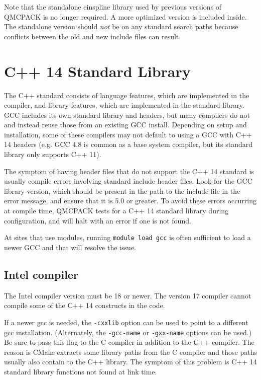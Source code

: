 Note that the standalone einspline library used by previous versions of QMCPACK
is no longer required. A more optimized version is included
inside. The standalone version should \emph{not} be on any standard
search paths because conflicts between the old and new include files
can result.

\section{C++ 14 Standard Library}
The C++ standard consists of language features, which are implemented in the compiler, and library features, which are implemented in the standard library.
GCC includes its own standard library and headers, but many compilers do not and instead reuse those from an existing GCC install.
Depending on setup and installation, some of these compilers may not default to using a GCC with C++ 14 headers (e.g. GCC 4.8 is common as a base system compiler, but its standard library only supports C++ 11).

The symptom of having header files that do not support the C++ 14 standard is usually
compile errors involving standard include header files.
Look for the GCC library version, which should be present in the path to the include file in the error message, and ensure that it is 5.0 or greater.
To avoid these errors occurring at compile time, QMCPACK tests for a C++ 14 standard
library during configuration, and will halt with an error if one is not found.

At sites that use modules, running \texttt{module load gcc} is often sufficient to
load a newer GCC and that will resolve the issue.

\subsection{Intel compiler}
The Intel compiler version must be 18 or newer.
The version 17 compiler cannot compile some of the C++ 14 constructs in the code.

If a newer gcc is needed, the \texttt{-cxxlib} option can be used to point to a different gcc installation.
(Alternately, the \texttt{-gcc-name} or \texttt{-gxx-name} options can be used.)
Be sure to pass this flag to the C compiler in addition to the C++ compiler.
The reason is CMake extracts some library paths from the C compiler and those paths usually also contain to the C++ library.
The symptom of this problem is C++ 14 standard library functions not found at link time.

